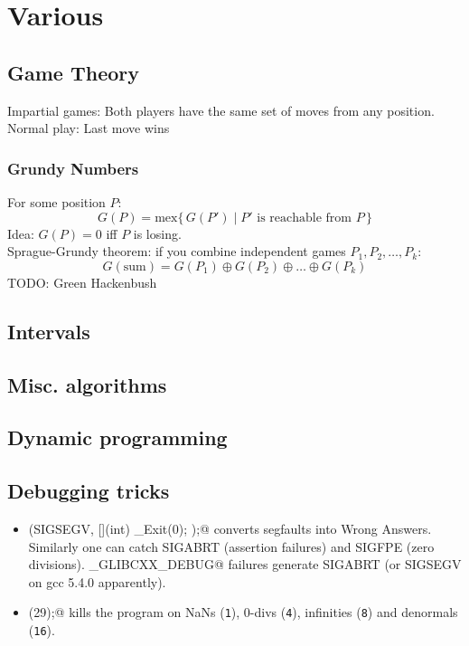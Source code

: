 \chapter{Various}

\section{Game Theory}
	Impartial games: Both players have the same set of moves from any position.
	Normal play: Last move wins
	\subsection{Grundy Numbers}
	For some position $P$:    
	\[
		G(P) = \mathrm{mex}\{\, G(P') \mid P' \text{ is reachable from } P \,\} 
	\]
	Idea: $G(P) = 0$ iff $P$ is losing. \\
	Sprague-Grundy theorem: if you combine independent games $P_1, P_2, \dots, P_k$: 
	\[
		G(\text{sum}) = G(P_1) \oplus G(P_2) \oplus \dots \oplus G(P_k)
	\]
	TODO: Green Hackenbush

\section{Intervals}

\section{Misc. algorithms}

\section{Dynamic programming}

\section{Debugging tricks}
	\begin{itemize}
		\item \verb@signal(SIGSEGV, [](int) { _Exit(0); });@ converts segfaults into Wrong Answers.
			Similarly one can catch SIGABRT (assertion failures) and SIGFPE (zero divisions).
			\verb@_GLIBCXX_DEBUG@ failures generate SIGABRT (or SIGSEGV on gcc 5.4.0 apparently).
		\item \verb@feenableexcept(29);@ kills the program on NaNs (\texttt 1), 0-divs (\texttt 4), infinities (\texttt 8) and denormals (\texttt{16}).
	\end{itemize}


